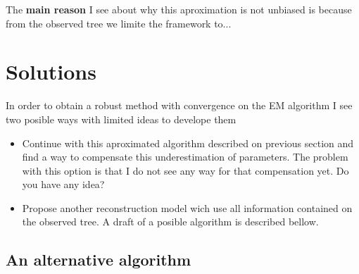 \documentclass[10pt,a4paper]{article}
\begin{document}
The {\bf main reason} I see about why this aproximation is not unbiased is because from the observed tree we limite the framework to...



\section*{Solutions}

In order to obtain a robust method with convergence on the EM algorithm I see two posible ways with limited ideas to develope them 

\begin{itemize}

\item Continue with this aproximated algorithm described on previous section and find a way to compensate this underestimation of parameters. The problem with this option is that I do not see any way for that compensation yet. Do you have any idea?

\item Propose another reconstruction model wich use all information contained on the observed tree. A draft of a posible algorithm is described bellow.
\end{itemize}

\subsection*{An alternative algorithm}

\end{document}
